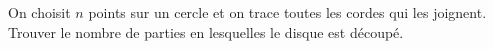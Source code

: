 On choisit $n$ points sur un cercle et on trace toutes les cordes qui les joignent. Trouver le nombre de parties en lesquelles le disque est découpé.
